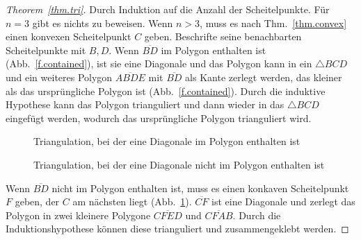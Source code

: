 \begin{proof}[Theorem~\ref{thm.tri}]
Durch Induktion auf die Anzahl der Scheitelpunkte. Für $n=3$ gibt es nichts zu beweisen. Wenn $n>3$, muss es nach Thm.~\ref{thm.convex} einen konvexen Scheitelpunkt $C$ geben. Beschrifte seine benachbarten Scheitelpunkte mit $B,D$. Wenn $\overline{BD}$ im Polygon enthalten ist (Abb.~\ref{f.contained}), ist sie eine Diagonale und das Polygon kann in ein $\triangle BCD$ und ein weiteres Polygon $\overline{ABDE}$ mit $\overline{BD}$ als Kante zerlegt werden, das kleiner als das ursprüngliche Polygon ist (Abb.~\ref{f.contained}). Durch die induktive Hypothese kann das Polygon trianguliert und dann wieder in das $\triangle BCD$ eingefügt werden, wodurch das ursprüngliche Polygon trianguliert wird.

\begin{figure}[t]
\begin{minipage}{.45\textwidth}
\caption{Triangulation, bei der eine Diagonale im Polygon enthalten ist}\label{f.contained}
\end{minipage}
\hfill
\begin{minipage}{.45\textwidth}
\caption{Triangulation, bei der eine Diagonale nicht im Polygon enthalten ist}\label{f.museum.concave-vertices}
\end{minipage}
\end{figure}
Wenn $\overline{BD}$ nicht im Polygon enthalten ist, muss es einen konkaven Scheitelpunkt $F$ geben, der $C$ am nächsten liegt (Abb.~\ref{f.museum.concave-vertices}). $\overline{CF}$ ist eine Diagonale und zerlegt das Polygon in zwei kleinere Polygone $\overline{CFED}$ und $\overline{CFAB}$. Durch die Induktionshypothese können diese trianguliert und zusammengeklebt werden.
\end{proof}

